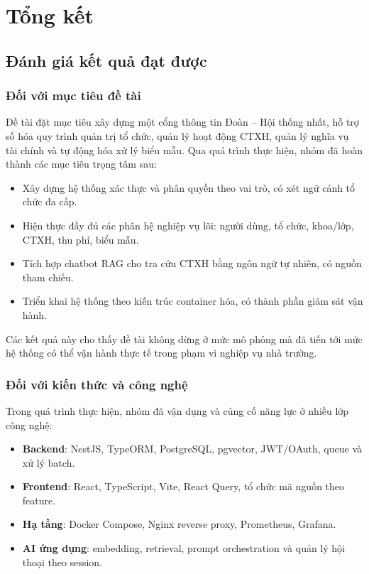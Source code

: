 \section{Tổng kết}

\subsection{Đánh giá kết quả đạt được}

\subsubsection{Đối với mục tiêu đề tài}
Đề tài đặt mục tiêu xây dựng một cổng thông tin Đoàn -- Hội thống nhất, hỗ trợ số hóa quy trình quản trị tổ chức, quản lý hoạt động CTXH, quản lý nghĩa vụ tài chính và tự động hóa xử lý biểu mẫu. Qua quá trình thực hiện, nhóm đã hoàn thành các mục tiêu trọng tâm sau:
\begin{itemize}
	\item Xây dựng hệ thống xác thực và phân quyền theo vai trò, có xét ngữ cảnh tổ chức đa cấp.
	\item Hiện thực đầy đủ các phân hệ nghiệp vụ lõi: người dùng, tổ chức, khoa/lớp, CTXH, thu phí, biểu mẫu.
	\item Tích hợp chatbot RAG cho tra cứu CTXH bằng ngôn ngữ tự nhiên, có nguồn tham chiếu.
	\item Triển khai hệ thống theo kiến trúc container hóa, có thành phần giám sát vận hành.
\end{itemize}

Các kết quả này cho thấy đề tài không dừng ở mức mô phỏng mà đã tiến tới mức hệ thống có thể vận hành thực tế trong phạm vi nghiệp vụ nhà trường.

\subsubsection{Đối với kiến thức và công nghệ}
Trong quá trình thực hiện, nhóm đã vận dụng và củng cố năng lực ở nhiều lớp công nghệ:
\begin{itemize}
	\item \textbf{Backend}: NestJS, TypeORM, PostgreSQL, pgvector, JWT/OAuth, queue và xử lý batch.
	\item \textbf{Frontend}: React, TypeScript, Vite, React Query, tổ chức mã nguồn theo feature.
	\item \textbf{Hạ tầng}: Docker Compose, Nginx reverse proxy, Prometheus, Grafana.
	\item \textbf{AI ứng dụng}: embedding, retrieval, prompt orchestration và quản lý hội thoại theo session.
\end{itemize}

